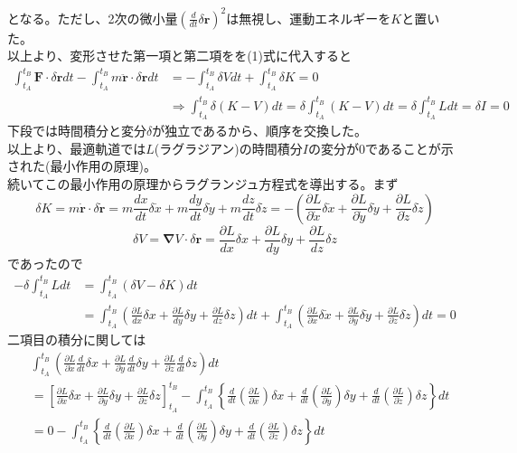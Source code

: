 \documentclass{jsarticle}
\begin{document}
となる。ただし、2次の微小量\(\displaystyle\left(\frac{d}{dt}\delta\bm{r}\right)^{2}\)は無視し、運動エネルギーを\(K\)と置いた。\\
以上より、変形させた第一項と第二項をを(1)式に代入すると
\begin{align*}
\int_{t_{A}}^{t_{B}}\bm{F}\cdot\delta\bm{r}dt-\int_{t_{A}}^{t_{B}}m\ddot{\bm{r}}\cdot\delta\bm{r}dt&=-\int_{t_{A}}^{t_{B}}\delta Vdt+\int_{t_{A}}^{t_{B}}\delta K=0\\
&\Longrightarrow\int_{t_{A}}^{t_{B}}\delta(K-V)dt=\delta\int_{t_{A}}^{t_{B}}(K-V)dt=\delta\int_{t_{A}}^{t_{B}}Ldt=\delta I=0
\end{align*}
下段では時間積分と変分\(\delta\)が独立であるから、順序を交換した。\\
以上より、最適軌道では\(L\)(ラグラジアン)の時間積分\(I\)の変分が0であることが示された(最小作用の原理)。\\
続いてこの最小作用の原理からラグランジュ方程式を導出する。まず
\[\delta K=m\dot{\bm{r}}\cdot\delta\dot{\bm{r}}=m\frac{dx}{dt}\delta\dot{x}+m\frac{dy}{dt}\delta\dot{y}+m\frac{dz}{dt}\delta\dot{z}=-\left(\frac{\partial L}{\partial \dot{x}}\delta\dot{x}+\frac{\partial L}{\partial \dot{y}}\delta\dot{y}+\frac{\partial L}{\partial \dot{z}}\delta\dot{z}\right)\]
\[\delta V=\bm{\nabla}V\cdot\delta\bm{r}=\frac{\partial L}{dx}\delta x+\frac{\partial L}{dy}\delta y+\frac{\partial L}{dz}\delta z\]
であったので
\begin{align*}
-\delta\int_{t_{A}}^{t_{B}}Ldt&=\int_{t_{A}}^{t_{B}}(\delta V-\delta K)dt\\
&=\int_{t_{A}}^{t_{B}}\left(\frac{\partial L}{dx}\delta x+\frac{\partial L}{dy}\delta y+\frac{\partial L}{dz}\delta z\right)dt+\int_{t_{A}}^{t_{B}}\left(\frac{\partial L}{\partial \dot{x}}\delta\dot{x}+\frac{\partial L}{\partial \dot{y}}\delta\dot{y}+\frac{\partial L}{\partial \dot{z}}\delta\dot{z}\right)dt=0
\end{align*}
二項目の積分に関しては
\begin{align*}
&\int_{t_{A}}^{t_{B}}\left(\frac{\partial L}{\partial\dot{x}}\frac{d}{dt}\delta x+\frac{\partial L}{\partial\dot{y}}\frac{d}{dt}\delta y+\frac{\partial L}{\partial\dot{z}}\frac{d}{dt}\delta z\right)dt\\
&=\left[\frac{\partial L}{\partial\dot{x}}\delta x+\frac{\partial L}{\partial\dot{y}}\delta y+\frac{\partial L}{\partial\dot{z}}\delta z\right]_{t_{A}}^{t_{B}}-\int_{t_{A}}^{t_{B}}\left\{\frac{d}{dt}\left(\frac{\partial L}{\partial\dot{x}}\right)\delta x+\frac{d}{dt}\left(\frac{\partial L}{\partial\dot{y}}\right)\delta y+\frac{d}{dt}\left(\frac{\partial L}{\partial\dot{z}}\right)\delta z\right\}dt\\
&=0-\int_{t_{A}}^{t_{B}}\left\{\frac{d}{dt}\left(\frac{\partial L}{\partial\dot{x}}\right)\delta x+\frac{d}{dt}\left(\frac{\partial L}{\partial\dot{y}}\right)\delta y+\frac{d}{dt}\left(\frac{\partial L}{\partial\dot{z}}\right)\delta z\right\}dt
\end{align*}
\end{document}
